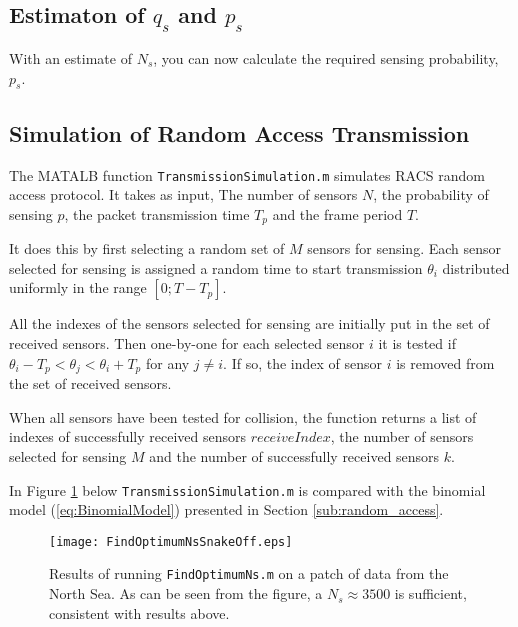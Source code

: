 \documentclass[Main]{subfiles}
\begin{document}
	

	\subsection{Estimaton of $q_s$ and $p_s$} %
	\label{sub:estimaton_of_q_s_and_p_s_}

		With an estimate of $N_s$, you can now calculate the required sensing probability, $p_s$.
	

	\subsection{Simulation of Random Access Transmission} %
	\label{sub:simulation_of_random_access_transmission}

		The MATALB function \texttt{TransmissionSimulation.m} simulates RACS random access protocol.
		It takes as input, The number of sensors $N$, the probability of sensing $p$, the packet transmission time $T_p$ and the frame period $T$.

		It does this by first selecting a random set of $M$ sensors for sensing.
		Each sensor selected for sensing is assigned a random time to start transmission $\theta_i$ distributed uniformly in the range $[0 ; T - T_p]$.

		All the indexes of the sensors selected for sensing are initially put in the set of received sensors.
		Then one-by-one for each selected sensor $i$ it is tested if 
		$\theta_i - T_p < \theta_j < \theta_i + T_p$
		for any
		$j \neq i$.
		If so, the index of sensor $i$ is removed from the set of received sensors.

		When all sensors have been tested for collision, the function returns a list of indexes of successfully received sensors $receiveIndex$, the number of sensors selected for sensing $M$ and the number of successfully received sensors $k$.

		In Figure \ref{fig:Mean_k_vs_p} below \texttt{TransmissionSimulation.m} is compared with the binomial model (\ref{eq:BinomialModel}) presented in Section \ref{sub:random_access}.

		\begin{figure}[H]
			\centering 
			\texttt{[image: FindOptimumNsSnakeOff.eps]}
			\caption{
				Results of running \texttt{FindOptimumNs.m} on a patch of data from the North Sea. As can be seen from the figure, a $N_s \approx 3500$ is sufficient, consistent with results above.}
			\label{fig:Mean_k_vs_p}
		\end{figure}
\end{document}
